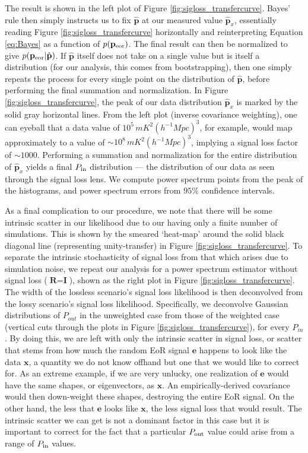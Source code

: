 \documentclass[preprint2,numberedappendix,tighten]{aastex6}  %
\newcommand{\p}{\mathbf{p}}
\newcommand{\phat}{\hat{\mathbf{p}}}
\begin{document}
The result is shown in the left plot of Figure \ref{fig:sigloss_transfercurve}. Bayes' rule then simply instructs us to fix $\phat$ at our measured value $\phat_{x}$, essentially reading Figure \ref{fig:sigloss_transfercurve} horizontally and reinterpreting Equation \eqref{eq:Bayes} as a function of $p( \p_{\rm eor})$. The final result can then be normalized to give $p( \p_{\rm eor} | \phat)$. If $\phat$ itself does not take on a single value but is itself a distribution (for our analysis, this comes from bootstrapping), then one simply repeats the process for every single point on the distribution of $\phat$, before performing the final summation and normalization. In Figure \ref{fig:sigloss_transfercurve}, the peak of our data distribution $
\hat{\textbf{p}}_{x}$ is marked by the solid gray horizontal lines. From the left plot (inverse covariance weighting), one can eyeball that a data value of $10^{5} \, mK^{2} (h^{-1} Mpc)^{3}$, for example, would map approximately to a 
value of $\sim10^{8} \, mK^{2} (h^{-1} Mpc)^{3}$, implying a signal loss factor of $\sim1000$. Performing a summation and normalization for the entire distribution of $\hat{\textbf{p}}_{x}$ yields a final $P_{\rm in}$ distribution --- the distribution of our data as seen through the signal loss lens. We compute power spectrum points from the peak of the histograms, and power spectrum errors from $95\%$ confidence intervals.

As a final complication to our procedure, we note that there will be some intrinsic scatter in our likelihood due to our having only a finite number of simulations. This is shown by the smeared `heat-map' around the solid black diagonal line (representing unity-transfer) in Figure \ref{fig:sigloss_transfercurve}. To separate the intrinsic stochasticity of signal loss from that which arises due to simulation noise, we repeat our analysis for a power spectrum estimator without signal loss ($\textbf{R} = \textbf{I}$), shown as the right plot in Figure \ref{fig:sigloss_transfercurve}. The width of the lossless scenario's signal loss likelihood is then deconvolved from the lossy scenario's signal loss likelihood. Specifically, we deconvolve Gaussian distributions of $P_{out}$ in the unweighted case from those of the weighted case (vertical cuts through the plots in Figure \ref{fig:sigloss_transfercurve}), for every $P_{in}$. By doing this, we are left with only the intrinsic scatter in signal loss, or scatter that stems from how much the random EoR signal $\textbf{e}$ happens to 
look like the data $\textbf{x}$, a quantity we do not know offhand but one that we would like to correct for. As an extreme example, if we are very unlucky, one realization of $\textbf{e}$ would have the same shapes, or eigenvectors, as $\textbf{x}$. An empirically-derived covariance would then down-weight these shapes, destroying the entire EoR signal. On the other hand, the less that $\textbf{e}$ looks like $\textbf{x}$, the less signal loss that would result. The intrinsic scatter we can get is not a dominant factor in this case but it is important to correct for the fact that a particular $P_{\rm out}$ value could arise from a range of $P_{\rm in}$ values. 
\end{document}
